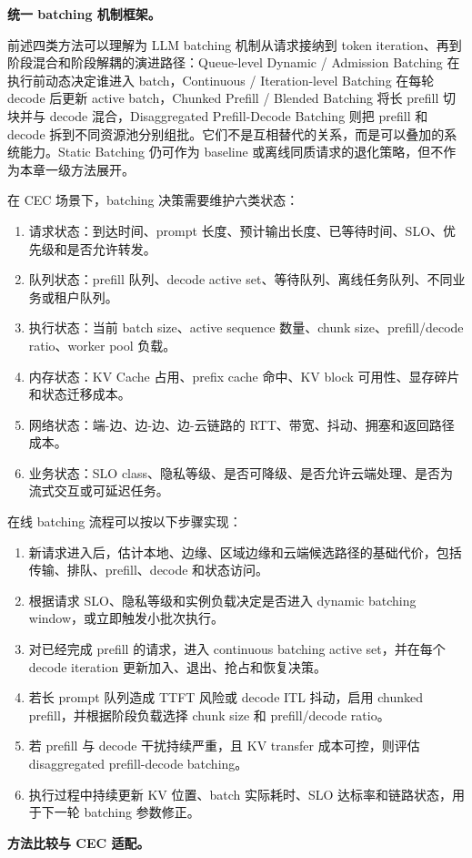 \documentclass[a4paper,twocolumn,10pt]{ctexart}
\begin{document}
\textbf{统一 batching 机制框架。}


前述四类方法可以理解为 LLM batching 机制从请求接纳到 token iteration、再到阶段混合和阶段解耦的演进路径：Queue-level Dynamic / Admission Batching 在执行前动态决定谁进入 batch，Continuous / Iteration-level Batching 在每轮 decode 后更新 active batch，Chunked Prefill / Blended Batching 将长 prefill 切块并与 decode 混合，Disaggregated Prefill-Decode Batching 则把 prefill 和 decode 拆到不同资源池分别组批。它们不是互相替代的关系，而是可以叠加的系统能力。Static Batching 仍可作为 baseline 或离线同质请求的退化策略，但不作为本章一级方法展开。


在 CEC 场景下，batching 决策需要维护六类状态：


\begin{enumerate}
\item 请求状态：到达时间、prompt 长度、预计输出长度、已等待时间、SLO、优先级和是否允许转发。

\item 队列状态：prefill 队列、decode active set、等待队列、离线任务队列、不同业务或租户队列。

\item 执行状态：当前 batch size、active sequence 数量、chunk size、prefill/decode ratio、worker pool 负载。

\item 内存状态：KV Cache 占用、prefix cache 命中、KV block 可用性、显存碎片和状态迁移成本。

\item 网络状态：端-边、边-边、边-云链路的 RTT、带宽、抖动、拥塞和返回路径成本。

\item 业务状态：SLO class、隐私等级、是否可降级、是否允许云端处理、是否为流式交互或可延迟任务。

\end{enumerate}
在线 batching 流程可以按以下步骤实现：


\begin{enumerate}
\item 新请求进入后，估计本地、边缘、区域边缘和云端候选路径的基础代价，包括传输、排队、prefill、decode 和状态访问。

\item 根据请求 SLO、隐私等级和实例负载决定是否进入 dynamic batching window，或立即触发小批次执行。

\item 对已经完成 prefill 的请求，进入 continuous batching active set，并在每个 decode iteration 更新加入、退出、抢占和恢复决策。

\item 若长 prompt 队列造成 TTFT 风险或 decode ITL 抖动，启用 chunked prefill，并根据阶段负载选择 chunk size 和 prefill/decode ratio。

\item 若 prefill 与 decode 干扰持续严重，且 KV transfer 成本可控，则评估 disaggregated prefill-decode batching。

\item 执行过程中持续更新 KV 位置、batch 实际耗时、SLO 达标率和链路状态，用于下一轮 batching 参数修正。

\end{enumerate}
\textbf{方法比较与 CEC 适配。}
\end{document}
